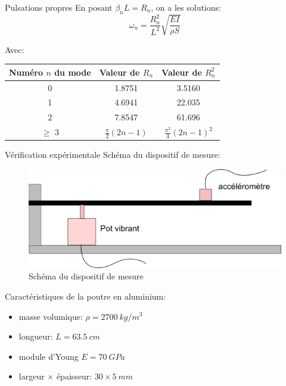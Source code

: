 \documentclass[xcolor=x11names,compress]{beamer}
\renewcommand{\(}{\begin{columns}}
\renewcommand{\)}{\end{columns}}
\newcommand{\<}[1]{\begin{column}{#1}}
\renewcommand{\>}{\end{column}}
\begin{document}
\begin{frame}{Pulsations propres}
En posant $\beta_n L = R_n$, on a les solutions:
\begin{equation}
\omega_n = \frac{R_n^2}{L^2} \sqrt{\frac{EI}{\rho S}}
\end{equation}

Avec:
\begin{minipage}[c]{\textwidth}
\centering
\begin{tabular}{c|c|c }
Numéro $n$ du mode  & Valeur de $R_n$ & Valeur de $R_n^2$\\\hline
0 & 1.8751 &3.5160\\
1 &  4.6941 &22.035\\
2 & 7.8547 &61.696\\ 
$\ge$ 3 & $\frac{\pi}{2}(2n-1)$ & $\frac{\pi^{2}}{4}(2n-1)^2$
\end{tabular}
\end{minipage}
\end{frame}

\begin{frame}{Vérification expérimentale}
Schéma du dispositif de mesure:
\begin{figure}
\includegraphics[scale=0.5]{./figures/presentation_poutre.png}
\caption*{\scriptsize   Schéma du dispositif de mesure}
\end{figure}
Caractéristiques de la poutre en aluminium:
\begin{itemize}
	\item masse volumique: $\rho = 2700~kg/m^3$
	\item longueur: $L = 63.5~ cm$
	\item module d'Young $E = 70~GPa$
	\item largeur $\times$ épaisseur: $30 \times 5~mm$
\end{itemize}
\end{frame}
\end{document}
